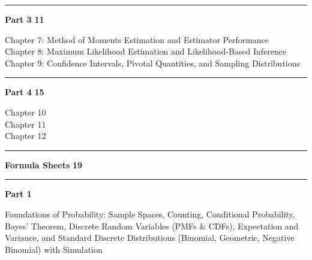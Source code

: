 \documentclass[11pt,letterpaper]{article}
\theoremstyle{remark}
\begin{document}
\vspace{0.8cm}
\noindent\rule{\textwidth}{0.5pt}
\vspace{0.8cm}

{\large \textbf{Part 3}} \dotfill \textbf{11}

\vspace{0.3cm}
\hspace{1.5cm} Chapter 7: Method of Moments Estimation and Estimator Performance  \\
\vspace{0.2cm}
\hspace{1.5cm} Chapter 8: Maximum Likelihood Estimation and Likelihood-Based Inference  \\
\vspace{0.2cm}
\hspace{1.5cm} Chapter 9: Confidence Intervals, Pivotal Quantities, and Sampling Distributions  \\

\vspace{0.8cm}
\noindent\rule{\textwidth}{0.5pt}
\vspace{0.8cm}

{\large \textbf{Part 4}} \dotfill \textbf{15}

\vspace{0.3cm}
\hspace{1.5cm} Chapter 10  \\
\vspace{0.2cm}
\hspace{1.5cm} Chapter 11  \\
\vspace{0.2cm}
\hspace{1.5cm} Chapter 12  \\

\vspace{0.8cm}
\noindent\rule{\textwidth}{0.5pt}
\vspace{0.8cm}

{\large \textbf{Formula Sheets}} \dotfill \textbf{19}

\vspace{0.8cm}
\noindent\rule{\textwidth}{1pt}

\newpage

\thispagestyle{empty}
\vspace*{\fill}
\begin{center}
{\fontsize{80}{96}\selectfont \textbf{Part 1}}

\vspace{1cm}

{\large Foundations of Probability: Sample Spaces, Counting, Conditional Probability, Bayes' Theorem, Discrete Random Variables (PMFs \& CDFs), Expectation and Variance, and Standard Discrete Distributions (Binomial, Geometric, Negative Binomial) with Simulation}
\end{center}
\vspace*{\fill}
\end{document}
